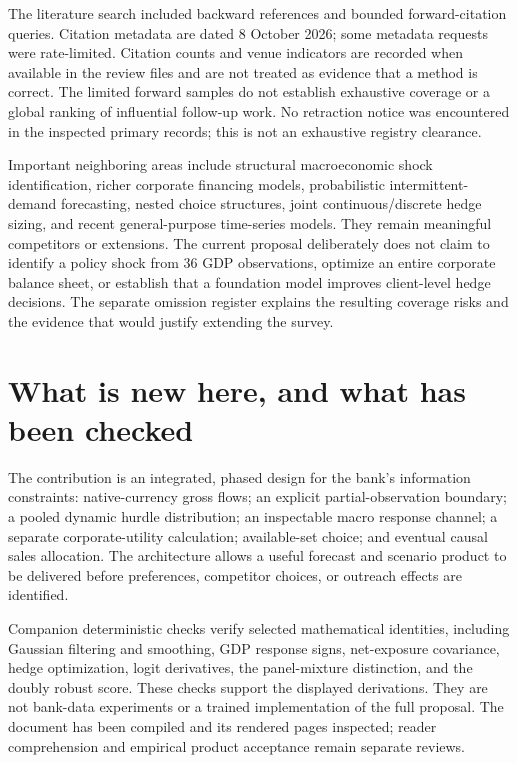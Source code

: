 The literature search included backward references and bounded forward-citation queries. Citation metadata are dated 8 October 2026; some metadata requests were rate-limited. Citation counts and venue indicators are recorded when available in the review files and are not treated as evidence that a method is correct. The limited forward samples do not establish exhaustive coverage or a global ranking of influential follow-up work. No retraction notice was encountered in the inspected primary records; this is not an exhaustive registry clearance.

Important neighboring areas include structural macroeconomic shock identification, richer corporate financing models, probabilistic intermittent-demand forecasting, nested choice structures, joint continuous/discrete hedge sizing, and recent general-purpose time-series models. They remain meaningful competitors or extensions. The current proposal deliberately does not claim to identify a policy shock from 36 GDP observations, optimize an entire corporate balance sheet, or establish that a foundation model improves client-level hedge decisions. The separate omission register explains the resulting coverage risks and the evidence that would justify extending the survey.

\section{What is new here, and what has been checked}
The contribution is an integrated, phased design for the bank's information constraints: native-currency gross flows; an explicit partial-observation boundary; a pooled dynamic hurdle distribution; an inspectable macro response channel; a separate corporate-utility calculation; available-set choice; and eventual causal sales allocation. The architecture allows a useful forecast and scenario product to be delivered before preferences, competitor choices, or outreach effects are identified.

Companion deterministic checks verify selected mathematical identities, including Gaussian filtering and smoothing, GDP response signs, net-exposure covariance, hedge optimization, logit derivatives, the panel-mixture distinction, and the doubly robust score. These checks support the displayed derivations. They are not bank-data experiments or a trained implementation of the full proposal. The document has been compiled and its rendered pages inspected; reader comprehension and empirical product acceptance remain separate reviews.
